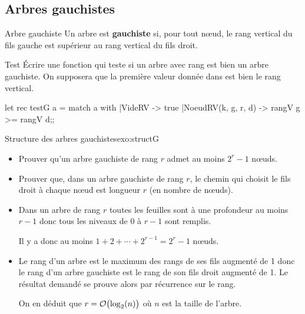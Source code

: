 \subsection{Arbres gauchistes}
\begin{defin}{Arbre gauchiste}{}
Un arbre est {\bf gauchiste} si, pour tout nœud, le rang vertical du fils gauche est supérieur au rang vertical du fils droit.
\end{defin}
\begin{exo}{Test}{}
Écrire une fonction  qui teste si un arbre avec rang est bien un arbre gauchiste. On supposera que la première valeur donnée dans  est bien le rang vertical.
\reponse
\begin{ocaml}
let rec testG a = 
   match a with
   |VideRV -> true
   |NoeudRV(k, g, r, d) -> rangV g >= rangV d;;
\end{ocaml}
\end{exo}
\begin{exo}{Structure des arbres gauchistes}{exo:structG}
\begin{itemize}
\item Prouver qu'un arbre gauchiste de rang $r$ admet au moins $2^r-1$ nœuds.
\item Prouver que, dans un arbre gauchiste de rang $r$, le chemin qui choisit le fils droit à chaque nœud est longueur $r$ (en nombre de nœuds).
\end{itemize}
\reponse
\begin{itemize}
\item Dans un arbre de rang $r$ toutes les feuilles sont à une profondeur au moins $r-1$ donc tous les niveaux de 0 à $r-1$ sont remplis. 

Il y a donc au moins $1+2+\cdots+2^{r-1}=2^r-1$ nœuds.
\item Le rang d'un arbre est le maximum des rangs de ses fils augmenté de 1 donc le rang d'un arbre gauchiste est le rang de son fils droit augmenté de 1. Le résultat demandé se prouve alors par récurrence sur le rang.

On en déduit que $r = {\cal O}\bigl(\log_2(n)\bigr)$ où $n$ est la taille de l'arbre.
\end{itemize}
\end{exo}
